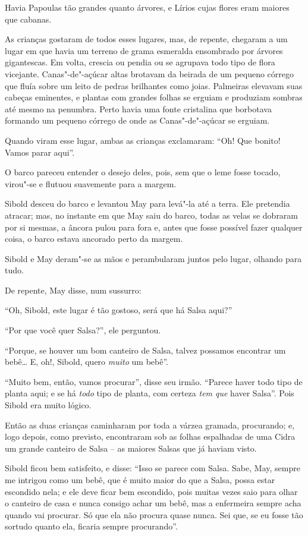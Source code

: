 Havia Papoulas tão grandes quanto árvores, e Lírios cujas flores eram
maiores que cabanas.

As crianças gostaram de todos esses lugares, mas, de repente, chegaram a
um lugar em que havia um terreno de grama esmeralda ensombrado por
árvores gigantescas. Em volta, crescia ou pendia ou se agrupava todo
tipo de flora vicejante. Canas"-de"-açúcar altas brotavam da beirada de um
pequeno córrego que fluía sobre um leito de pedras brilhantes como
joias. Palmeiras elevavam suas cabeças eminentes, e plantas com grandes
folhas se erguiam e produziam sombras até mesmo na penumbra. Perto havia
uma fonte cristalina que borbotava formando um pequeno córrego de onde
as Canas"-de"-açúcar se erguiam.

Quando viram esse lugar, ambas as crianças exclamaram: ``Oh! Que bonito!
Vamos parar aqui''.

O barco pareceu entender o desejo deles, pois, sem que o leme fosse
tocado, virou"-se e flutuou suavemente para a margem.

Sibold desceu do barco e levantou May para levá"-la até a terra. Ele
pretendia atracar; mas, no instante em que May saiu do barco, todas as
velas se dobraram por si mesmas, a âncora pulou para fora e, antes que
fosse possível fazer qualquer coisa, o barco estava ancorado perto da
margem.

Sibold e May deram"-se as mãos e perambularam juntos pelo lugar, olhando
para tudo.

De repente, May disse, num sussurro:

``Oh, Sibold, este lugar é tão gostoso, será que há Salsa aqui?''

``Por que você quer Salsa?'', ele perguntou.

``Porque, se houver um bom canteiro de Salsa, talvez possamos encontrar
um bebê… E, oh!, Sibold, quero \emph{muito} um bebê''.

``Muito bem, então, vamos procurar'', disse seu irmão. ``Parece haver
todo tipo de planta aqui; e se há \emph{todo} tipo de planta, com
certeza \emph{tem que} haver Salsa''. Pois Sibold era muito lógico.

Então as duas crianças caminharam por toda a várzea gramada,
procurando; e, logo depois, como previsto, encontraram sob as folhas
espalhadas de uma Cidra um grande canteiro de Salsa -- as maiores Salsas
que já haviam visto.

Sibold ficou bem satisfeito, e disse: ``Isso se parece com Salsa. Sabe,
May, sempre me intrigou como um bebê, que é muito maior do que a Salsa,
possa estar escondido nela; e ele deve ficar bem escondido, pois muitas
vezes saio para olhar o canteiro de casa e nunca consigo achar um bebê,
mas a enfermeira sempre acha quando vai procurar. Só que ela não procura
quase nunca. Sei que, se eu fosse tão sortudo quanto ela, ficaria sempre
procurando''.

